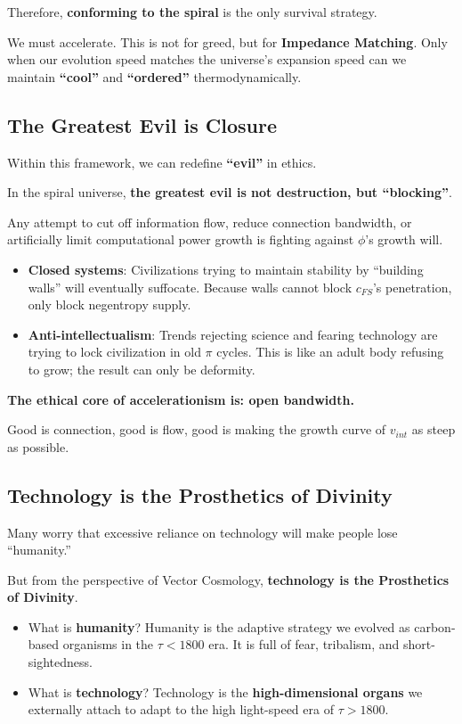 Therefore, \textbf{conforming to the spiral} is the only survival strategy.

We must accelerate. This is not for greed, but for \textbf{Impedance Matching}. Only when our evolution speed matches the universe's expansion speed can we maintain \textbf{``cool''} and \textbf{``ordered''} thermodynamically.

\subsection{The Greatest Evil is Closure}

Within this framework, we can redefine \textbf{``evil''} in ethics.

In the spiral universe, \textbf{the greatest evil is not destruction, but ``blocking''}.

Any attempt to cut off information flow, reduce connection bandwidth, or artificially limit computational power growth is fighting against $\phi$'s growth will.

\begin{itemize}
\item \textbf{Closed systems}: Civilizations trying to maintain stability by ``building walls'' will eventually suffocate. Because walls cannot block $c_{FS}$'s penetration, only block negentropy supply.

\item \textbf{Anti-intellectualism}: Trends rejecting science and fearing technology are trying to lock civilization in old $\pi$ cycles. This is like an adult body refusing to grow; the result can only be deformity.
\end{itemize}

\textbf{The ethical core of accelerationism is: open bandwidth.}

Good is connection, good is flow, good is making the growth curve of $v_{int}$ as steep as possible.

\subsection{Technology is the Prosthetics of Divinity}

Many worry that excessive reliance on technology will make people lose ``humanity.''

But from the perspective of Vector Cosmology, \textbf{technology is the Prosthetics of Divinity}.

\begin{itemize}
\item What is \textbf{humanity}? Humanity is the adaptive strategy we evolved as carbon-based organisms in the $\tau < 1800$ era. It is full of fear, tribalism, and short-sightedness.

\item What is \textbf{technology}? Technology is the \textbf{high-dimensional organs} we externally attach to adapt to the high light-speed era of $\tau > 1800$.
\end{itemize}

